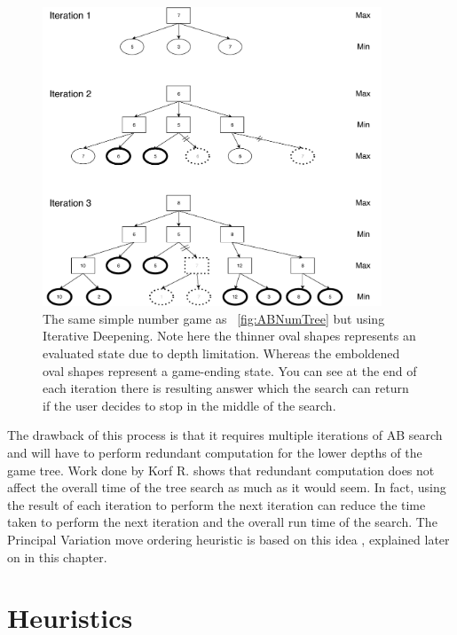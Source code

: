 \documentclass{l4proj}
\begin{document}
\begin{figure}[!ht]
\centering
\includegraphics[width=0.9\textwidth]{ABNumIDeep.pdf}

\caption{The same simple number game as ~\autoref{fig:ABNumTree} but using Iterative Deepening. Note here the thinner oval shapes represents an evaluated state due to depth limitation. Whereas the emboldened oval shapes represent a game-ending state. You can see at the end of each iteration there is resulting answer which the search can return if the user decides to stop in the middle of the search.}
\label{fig:iter-deep}
\end{figure}


The drawback of this process is that it requires multiple iterations of AB search and will have to perform redundant computation for the lower depths of the game tree. Work done by Korf R. \cite{Korf1985} shows that redundant computation does not affect the overall time of the tree search as much as it would seem. In fact, using the result of each iteration to perform the next iteration can reduce the time taken to perform the next iteration and the overall run time of the search. The Principal Variation move ordering heuristic is based on this idea , explained later on in this chapter.





\section{Heuristics}
\end{document}
